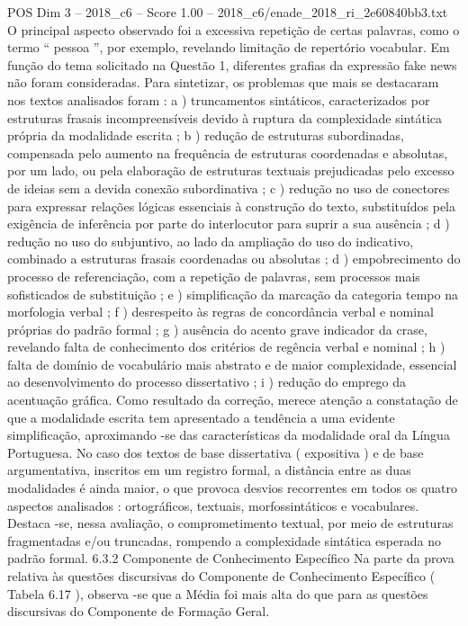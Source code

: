 \begin{textsample}{POS Dim 3 – 2018\_c6 – Score 1.00 – 2018\_c6/enade\_2018\_ri\_2e60840bb3.txt}
O principal aspecto observado foi a excessiva repetição de certas palavras, como o termo “ pessoa ”, por exemplo, revelando limitação de repertório vocabular.
Em função do tema solicitado na Questão 1, diferentes grafias da expressão fake news não foram consideradas.
Para sintetizar, os problemas que mais se destacaram nos textos analisados foram : a ) truncamentos sintáticos, caracterizados por estruturas frasais incompreensíveis devido à ruptura da complexidade sintática própria da modalidade escrita ; b ) redução de estruturas subordinadas, compensada pelo aumento na frequência de estruturas coordenadas e absolutas, por um lado, ou pela elaboração de estruturas textuais prejudicadas pelo excesso de ideias sem a devida conexão subordinativa ; c ) redução no uso de conectores para expressar relações lógicas essenciais à construção do texto, substituídos pela exigência de inferência por parte do interlocutor para suprir a sua ausência ; d ) redução no uso do subjuntivo, ao lado da ampliação do uso do indicativo, combinado a estruturas frasais coordenadas ou absolutas ; d ) empobrecimento do processo de referenciação, com a repetição de palavras, sem processos mais sofisticados de substituição ; e ) simplificação da marcação da categoria tempo na morfologia verbal ; f ) desrespeito às regras de concordância verbal e nominal próprias do padrão formal ; g ) ausência do acento grave indicador da crase, revelando falta de conhecimento dos critérios de regência verbal e nominal ; h ) falta de domínio de vocabulário mais abstrato e de maior complexidade, essencial ao desenvolvimento do processo dissertativo ; i ) redução do emprego da acentuação gráfica.
Como resultado da correção, merece atenção a constatação de que a modalidade escrita tem apresentado a tendência a uma evidente simplificação, aproximando -se das características da modalidade oral da Língua Portuguesa.
No caso dos textos de base dissertativa ( expositiva ) e de base argumentativa, inscritos em um registro formal, a distância entre as duas modalidades é ainda maior, o que provoca desvios recorrentes em todos os quatro aspectos analisados : ortográficos, textuais, morfossintáticos e vocabulares.
Destaca -se, nessa avaliação, o comprometimento textual, por meio de estruturas fragmentadas e/ou truncadas, rompendo a complexidade sintática esperada no padrão formal. 6.3.2 Componente de Conhecimento Específico Na parte da prova relativa às questões discursivas do Componente de Conhecimento Específico ( Tabela 6.17 ), observa -se que a Média foi mais alta do que para as questões discursivas do Componente de Formação Geral.

\end{textsample}
